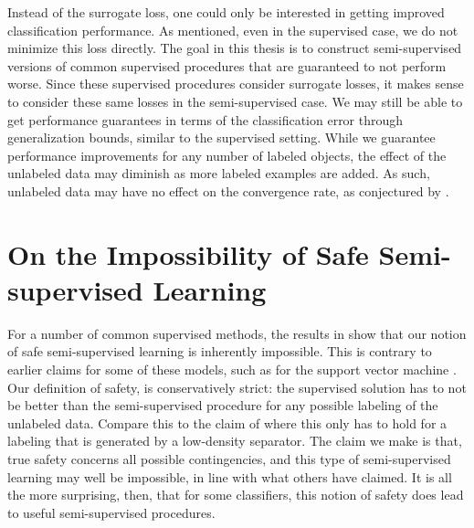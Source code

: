 \documentclass[twoside]{memoir}\usepackage[]{graphicx}\usepackage{xcolor}
\renewcommand{\cite}{\citep}
\begin{document}
Instead of the surrogate loss, one could only be interested in getting improved classification performance. As mentioned, even in the supervised case, we do not minimize this loss directly. The goal in this thesis is to construct semi-supervised versions of common supervised procedures that are guaranteed to not perform worse. Since these supervised procedures consider surrogate losses, it makes sense to consider these same losses in the semi-supervised case. We may still be able to get performance guarantees in terms of the classification error through generalization bounds, similar to the supervised setting. While we guarantee performance improvements for any number of labeled objects, the effect of the unlabeled data may diminish as more labeled examples are added. As such, unlabeled data may have no effect on the convergence rate, as conjectured by \cite{Ben-David2008}. 

\section{On the Impossibility of Safe Semi-supervised Learning}
For a number of common supervised methods, the results in  show that our notion of safe semi-supervised learning is inherently impossible. This is contrary to earlier claims for some of these models, such as for the support vector machine \cite{Li2015}. Our definition of safety, is conservatively strict: the supervised solution has to not be better than the semi-supervised procedure for any possible labeling of the unlabeled data. Compare this to the claim of \citet{Li2015} where this only has to hold for a labeling that is generated by a low-density separator. The claim we make is that, true safety concerns all possible contingencies, and this type of semi-supervised learning may well be impossible, in line with what others have claimed. It is all the more surprising, then, that for some classifiers, this notion of safety does lead to useful semi-supervised procedures.
\end{document}
